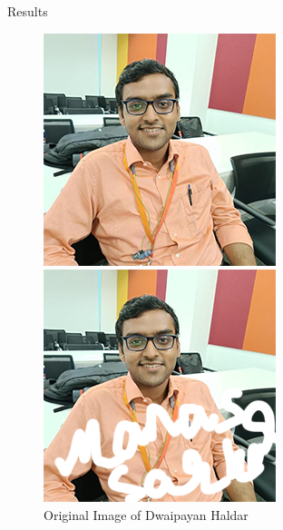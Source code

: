 \documentclass{beamer}
\begin{document}
\begin{frame}{Results}
    \begin{figure}[h]
    \centering
    \begin{minipage}{0.32\textwidth}
        \centering
        \includegraphics[width=\linewidth]{Image.jpg} %
        \caption{Original Image of Dwaipayan Haldar}
    \end{minipage}
    \hfill
    \begin{minipage}{0.32\textwidth}
        \centering
        \includegraphics[width=\linewidth]{Image_for_ts_gpt.png} %

\end{minipage}
\end{figure}
\end{frame}
\end{document}
